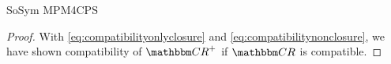 \begin{copiedFrom}{SoSym MPM4CPS}
\begin{proof}
    With \autoref{eq:compatibilityonlyclosure} and \autoref{eq:compatibilitynonclosure}, we have shown compatibility of $\transitiveclosure{\consistencyrelationset{CR}}$ if $\consistencyrelationset{CR}$ is compatible.
\end{proof}






\end{copiedFrom}
